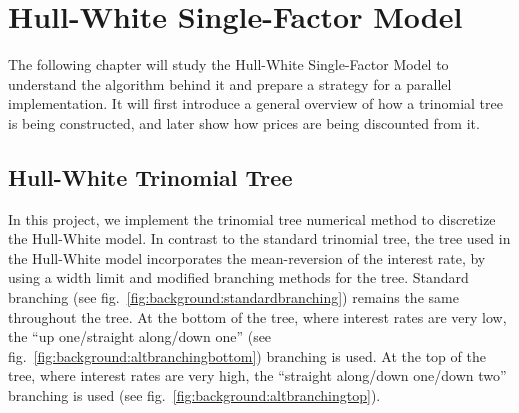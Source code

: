 \chapter{Hull-White Single-Factor Model}
\label{chapter:hullwhitemodel}
The following chapter will study the Hull-White Single-Factor Model to understand the algorithm behind it and prepare a strategy for a parallel implementation. It will first introduce a general overview of how a trinomial tree is being constructed, and later show how prices are being discounted from it. 

\section{Hull-White Trinomial Tree}
In this project, we implement the trinomial tree numerical method to discretize the Hull-White model.  In contrast to the standard trinomial tree, the tree used in the Hull-White model incorporates the mean-reversion of the interest rate, by using a width limit and modified branching methods for the tree. Standard branching (see fig.~\ref{fig:background:standardbranching}) remains the same throughout the tree. At the bottom of the tree, where interest rates are very low, the \enquote{up one/straight along/down one} (see fig.~\ref{fig:background:altbranchingbottom}) branching is used. At the top of the tree, where interest rates are very high, the \enquote{straight along/down one/down two} branching is used (see fig.~\ref{fig:background:altbranchingtop}). 

